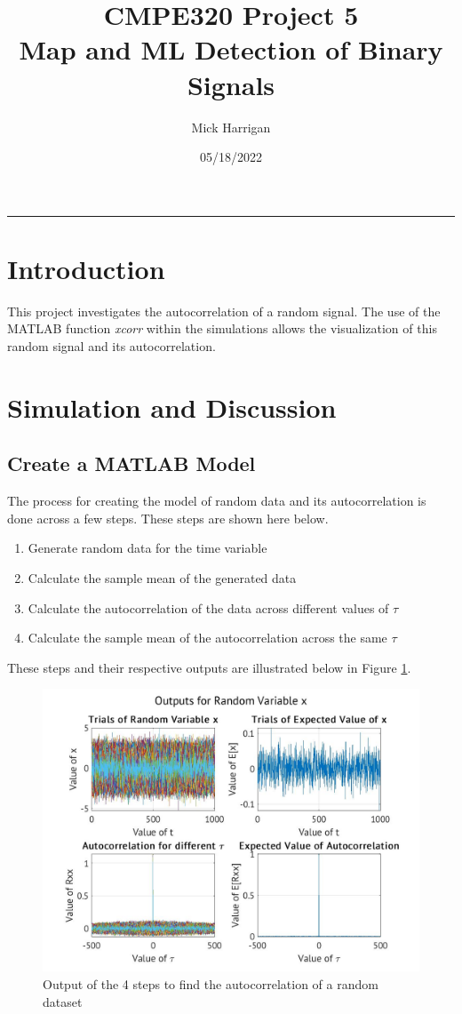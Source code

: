 \documentclass[a4paper, 11pt]{article}
\author{Mick Harrigan}
\date{05/18/2022}
\title{\textbf{CMPE320 Project 5}\\\medskip
\large Map and ML Detection of Binary Signals}
\begin{document}
\maketitle
\hrule

\setlength{\parindent}{0pt}

\section{Introduction}
\label{sec:org9c63fbf}
This project investigates the autocorrelation of a random signal. The use of the MATLAB function \emph{xcorr} within the simulations allows the visualization of this random signal and its autocorrelation.

\section{Simulation and Discussion}
\label{sec:org37edc8d}
\subsection{Create a MATLAB Model}
\label{sec:org375a5aa}
The process for creating the model of random data and its autocorrelation is done across a few steps.
These steps are shown here below.

\begin{enumerate}
\item Generate random data for the time variable
\item Calculate the sample mean of the generated data
\item Calculate the autocorrelation of the data across different values of \(\tau\)
\item Calculate the sample mean of the autocorrelation across the same \(\tau\)
\end{enumerate}

These steps and their respective outputs are illustrated below in Figure \ref{fig:MatlabModel}.

\begin{figure}[htbp]
\centering
\includegraphics[width=.9\linewidth]{./Images/MatlabModel.jpg}
\caption{\label{fig:MatlabModel}Output of the 4 steps to find the autocorrelation of a random dataset}
\end{figure}
\end{document}

